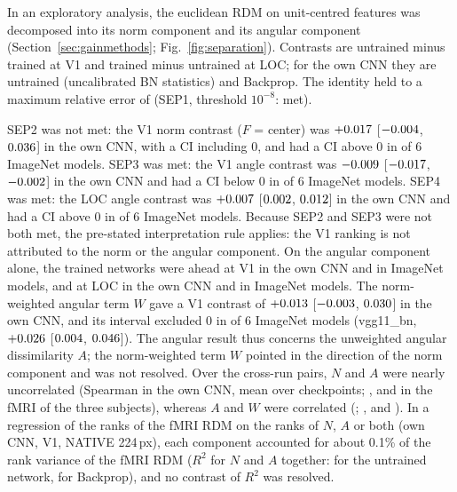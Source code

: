 In an exploratory analysis, the euclidean RDM on unit-centred features was decomposed
into its norm component and its angular component (Section~\ref{sec:gainmethods};
Fig.~\ref{fig:separation}). Contrasts are untrained minus trained at V1 and trained minus
untrained at LOC; for the own CNN they are untrained (uncalibrated BN statistics) and
Backprop. The identity held to a maximum relative error of
\SepOneMaxRelError{} (SEP1, threshold $10^{-8}$: met).

SEP2 was not met: the V1 norm contrast ($F$ = center) was $+0.017$
[$-0.004$, $0.036$] in the own CNN, with a CI
including 0, and had a CI above 0 in \SepTwoModels{} of 6 ImageNet models. SEP3 was met:
the V1 angle contrast was $-0.009$ [$-0.017$,
$-0.002$] in the own CNN and had a CI below 0 in \SepThreeModels{} of 6
ImageNet models. SEP4 was met: the LOC angle contrast was $+0.007$
[$0.002$, $0.012$] in the own CNN and had a CI above 0
in \SepFourModels{} of 6 ImageNet models. Because SEP2 and SEP3 were not both met, the
pre-stated interpretation rule applies: the V1 ranking is not attributed to the norm or the angular component. On the angular component alone, the trained
networks were ahead at V1 in the own CNN and in \SepThreeModels{} ImageNet models, and
at LOC in the own CNN and in \SepFourModels{} ImageNet models. The norm-weighted angular
term $W$ gave a V1 contrast of $+0.013$ [$-0.003$, $0.030$] in the own
CNN, and its interval excluded 0 in \WAngImnPosModels{} of 6 ImageNet models (vgg11\_bn,
$+0.026$ [$0.004$, $0.046$]). The angular result
thus concerns the unweighted angular dissimilarity $A$; the norm-weighted term $W$ pointed in
the direction of the norm component and was not resolved. Over the cross-run pairs, $N$ and $A$
were nearly uncorrelated (Spearman \WRankNAOwn{} in the own CNN, mean over checkpoints;
\WRankNASubOne, \WRankNASubTwo{} and \WRankNASubThree{} in the fMRI of the three subjects),
whereas $A$ and $W$ were correlated (\WRankAWOwn; \WRankAWSubOne, \WRankAWSubTwo{} and
\WRankAWSubThree). In a regression of the ranks of the fMRI RDM on the ranks of $N$, $A$ or
both (own CNN, V1, NATIVE 224\,px), each component accounted for about 0.1\% of the rank
variance of the fMRI RDM ($R^2$ for $N$ and $A$ together: \WRtwoNARand{} for the untrained
network, \WRtwoNABp{} for Backprop), and no contrast of $R^2$ was resolved.

